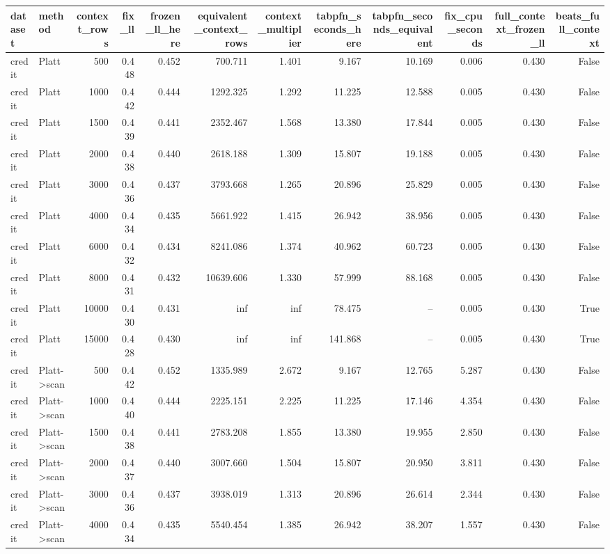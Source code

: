 \begin{tabular}{llrrrrrrrrrr}
\toprule
dataset & method & context_rows & fix_ll & frozen_ll_here & equivalent_context_rows & context_multiplier & tabpfn_seconds_here & tabpfn_seconds_equivalent & fix_cpu_seconds & full_context_frozen_ll & beats_full_context \\
\midrule
credit & Platt & 500 & 0.448 & 0.452 & 700.711 & 1.401 & 9.167 & 10.169 & 0.006 & 0.430 & False \\
credit & Platt & 1000 & 0.442 & 0.444 & 1292.325 & 1.292 & 11.225 & 12.588 & 0.005 & 0.430 & False \\
credit & Platt & 1500 & 0.439 & 0.441 & 2352.467 & 1.568 & 13.380 & 17.844 & 0.005 & 0.430 & False \\
credit & Platt & 2000 & 0.438 & 0.440 & 2618.188 & 1.309 & 15.807 & 19.188 & 0.005 & 0.430 & False \\
credit & Platt & 3000 & 0.436 & 0.437 & 3793.668 & 1.265 & 20.896 & 25.829 & 0.005 & 0.430 & False \\
credit & Platt & 4000 & 0.434 & 0.435 & 5661.922 & 1.415 & 26.942 & 38.956 & 0.005 & 0.430 & False \\
credit & Platt & 6000 & 0.432 & 0.434 & 8241.086 & 1.374 & 40.962 & 60.723 & 0.005 & 0.430 & False \\
credit & Platt & 8000 & 0.431 & 0.432 & 10639.606 & 1.330 & 57.999 & 88.168 & 0.005 & 0.430 & False \\
credit & Platt & 10000 & 0.430 & 0.431 & inf & inf & 78.475 & -- & 0.005 & 0.430 & True \\
credit & Platt & 15000 & 0.428 & 0.430 & inf & inf & 141.868 & -- & 0.005 & 0.430 & True \\
credit & Platt->scan & 500 & 0.442 & 0.452 & 1335.989 & 2.672 & 9.167 & 12.765 & 5.287 & 0.430 & False \\
credit & Platt->scan & 1000 & 0.440 & 0.444 & 2225.151 & 2.225 & 11.225 & 17.146 & 4.354 & 0.430 & False \\
credit & Platt->scan & 1500 & 0.438 & 0.441 & 2783.208 & 1.855 & 13.380 & 19.955 & 2.850 & 0.430 & False \\
credit & Platt->scan & 2000 & 0.437 & 0.440 & 3007.660 & 1.504 & 15.807 & 20.950 & 3.811 & 0.430 & False \\
credit & Platt->scan & 3000 & 0.436 & 0.437 & 3938.019 & 1.313 & 20.896 & 26.614 & 2.344 & 0.430 & False \\
credit & Platt->scan & 4000 & 0.434 & 0.435 & 5540.454 & 1.385 & 26.942 & 38.207 & 1.557 & 0.430 & False \\

\end{tabular}
